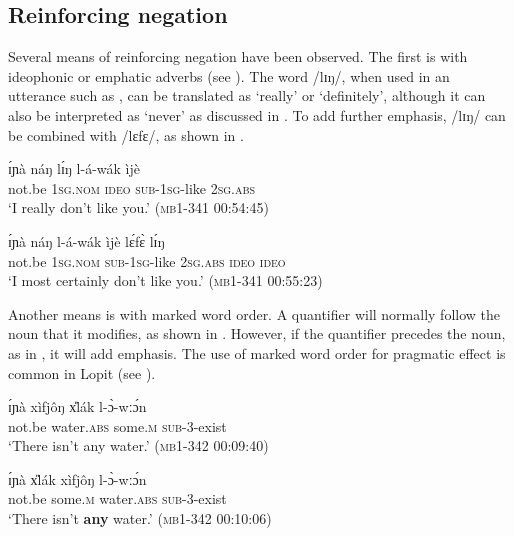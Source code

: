 \documentclass[output=paper,colorlinks,citecolor=brown,draftmode]{langscibook}
\begin{document}
\subsection{Reinforcing negation}
\label{sec:lop:4.4}
Several means of reinforcing negation have been observed. The first is with ideophonic or emphatic adverbs (see ). The word /lɪŋ/, when used in an utterance such as , can be translated as ‘really’ or ‘definitely’, although it can also be interpreted as ‘never’ as discussed in . To add further emphasis, /lɪŋ/ can be combined with /lɛfɛ/, as shown in .  

\ea\label{ex:lop:98}
        \gll ɪ́ɲà náŋ lɪ́ŋ l-á-wák ìjè \\ 
             not.be 1\textsc{sg.nom} \textsc{ideo} \textsc{sub-1sg-}like 2\textsc{sg.abs} \\
        \glt ‘I really don’t like you.’ (\textsc{mb1-341} 00:54:45)
\z

\ea\label{ex:lop:99}
        \gll ɪ́ɲà náŋ l-á-wák ìjè lɛ́fɛ̀ lɪ́ŋ  \\ 
             not.be 1\textsc{sg.nom} \textsc{sub-1sg-}like 2\textsc{sg.abs} \textsc{ideo}  \textsc{ideo} \\
        \glt ‘I most certainly don’t like you.’ (\textsc{mb1-341} 00:55:23)
\z

Another means is with marked word order. A quantifier will normally follow the noun that it modifies, as shown in . However, if the quantifier precedes the noun, as in , it will add emphasis. The use of marked word order for pragmatic effect is common in Lopit (see \citealt[152]{MoodieBillington2020}). 

\ea\label{ex:lop:100}
        \gll ɪ́ɲà xìfjôŋ x{\U}lák l-ɔ̀-wːɔ́n  \\
             not.be water.\textsc{abs} some.\textsc{m} \textsc{sub-3-}exist \\
        \glt ‘There isn’t any water.’ (\textsc{mb1-342} 00:09:40)
\z

\ea\label{ex:lop:101}
        \gll ɪ́ɲà x{\U}lák xìfjôŋ l-ɔ̀-wːɔ́n  \\
             not.be some.\textsc{m} water.\textsc{abs} \textsc{sub-3-}exist \\
        \glt ‘There isn’t \textbf{any} water.’ (\textsc{mb1-342} 00:10:06)
\z
\end{document}

